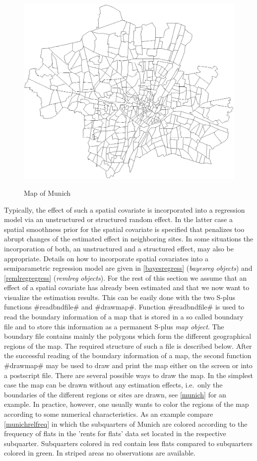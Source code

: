\begin{figure}
\centering
\includegraphics [scale=0.5]{grafiken/munich.eps}
{\em\caption{\label{munich} Map of Munich}}
\end{figure}


Typically, the effect of such a spatial covariate is incorporated
into a regression model via an unstructured or structured random
effect. In the latter case a spatial smoothness prior for the
spatial covariate is specified that penalizes too abrupt changes of
the estimated effect in neighboring sites. In some situations the
incorporation of both, an unstructured and a structured effect, may
also be appropriate. Details on how to incorporate spatial
covariates into a semiparametric regression  model are given in
\autoref{bayesregress} ({\em bayesreg objects}) and
\autoref{remlregregress} ({\em remlreg objects}). For the rest of
this section we assume that an effect of a spatial covariate has
already been estimated and that we now want to visualize the
estimation results. This can be easily done with the two S-plus
functions #readbndfile# and #drawmap#. Function #readbndfile# is
used to read the boundary information of a map that is stored in a
so called boundary file and to store this information as a permanent
S-plus {\em map object}. The boundary file contains mainly the
polygons which form the different geographical regions of the map.
The required structure of such a file is described below. After the
successful reading of the boundary information of a map, the second
function #drawmap# may be used to draw and print the map either on
the screen or into a postscript file. There are several possible
ways to draw the map. In the simplest case the map can be drawn
without any estimation effects, i.e.~only the boundaries of the
different regions or sites are drawn, see \autoref{munich} for an
example. In practice, however, one usually wants to color the
regions of the map according to some numerical characteristics. As
an example compare \autoref{munichrelfreq} in which the subquarters
of Munich are colored according to the frequency of flats in the
'rents for flats' data set located in the respective subquarter.
Subquarters colored in red contain less flats compared to
subquarters colored in green. In striped areas no observations are
available.


